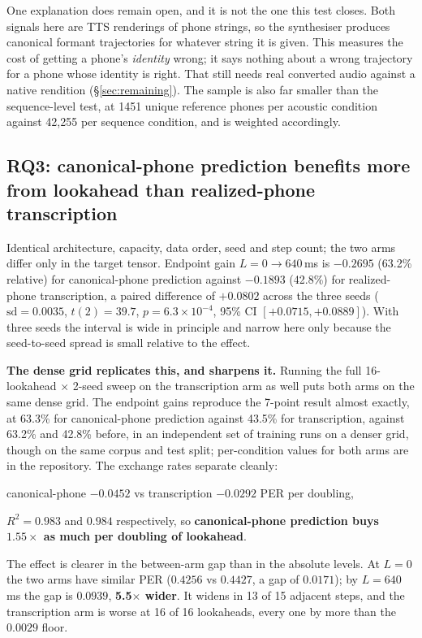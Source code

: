 \documentclass[journal]{IEEEtran}
\begin{document}
One explanation does remain open, and it is not the one this test closes. Both
signals here are TTS renderings of phone strings, so the synthesiser produces
canonical formant trajectories for whatever string it is given. This measures
the cost of getting a phone's \emph{identity} wrong; it says nothing about a
wrong trajectory for a phone whose identity is right. That still needs real
converted audio against a native rendition (\S\ref{sec:remaining}). The sample
is also far smaller than the sequence-level test, at 1451 unique reference
phones per acoustic condition against 42{,}255 per sequence condition, and
is weighted accordingly.

\subsection{RQ3: canonical-phone prediction benefits more from lookahead than realized-phone transcription}
\label{sec:rq3}

Identical architecture, capacity, data order, seed and step count; the two arms
differ only in the target tensor. Endpoint gain $L{=}0\rightarrow640$\,ms is
$-0.2695$ (63.2\% relative) for canonical-phone prediction against $-0.1893$
(42.8\%) for realized-phone transcription, a paired difference of $+0.0802$
across the three seeds ($\mathrm{sd}=0.0035$, $t(2)=39.7$, $p=6.3\times
10^{-4}$, 95\% CI $[+0.0715, +0.0889]$). With three seeds the interval is wide
in principle and narrow here only because the seed-to-seed spread is small
relative to the effect.

\textbf{The dense grid replicates this, and sharpens it.} Running the full
16-lookahead $\times$ 2-seed sweep on the transcription arm as well puts both
arms on the same dense grid. The endpoint gains
reproduce the 7-point result almost exactly, at 63.3\% for canonical-phone
prediction against
43.5\% for transcription, against 63.2\% and 42.8\% before, in an
independent set of training runs on a denser grid, though on the same corpus
and test split; per-condition values for both arms are in the repository.
The exchange rates separate cleanly:
\begin{center}
canonical-phone $-0.0452$ vs transcription $-0.0292$ PER per doubling,
\end{center}
$R^2 = 0.983$ and $0.984$ respectively, so \textbf{canonical-phone prediction
buys $\mathbf{1.55\times}$ as much per doubling of lookahead}.

The effect is clearer in the between-arm gap than in the absolute levels. At
$L{=}0$ the two arms have similar PER ($0.4256$ vs $0.4427$, a gap of
$0.0171$); by
$L{=}640$\,ms the gap is $0.0939$, \textbf{5.5$\times$ wider}. It widens in
13 of 15 adjacent steps, and the transcription arm is worse at 16 of 16
lookaheads, every one by more than the $0.0029$ floor.
\end{document}
